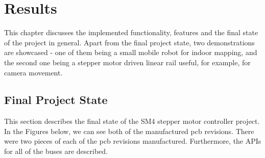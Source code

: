 \chapter{Results}
\label{ch:results}
This chapter discusses the implemented functionality, features and the final state of the project in general.
Apart from the final project state, two demonstrations are showcased - one of them being a small mobile robot for indoor mapping, and the second one being a stepper motor driven linear rail useful, for example, for camera movement.

\section{Final Project State}
\label{sec:final_project_state}
This section describes the final state of the SM4 stepper motor controller project.
In the Figures below, we can see both of the manufactured \acs{pcb} revisions.
There were two pieces of each of the \acs{pcb} revisions manufactured.
Furthermore, the \acs{API}s for all of the buses are described.

